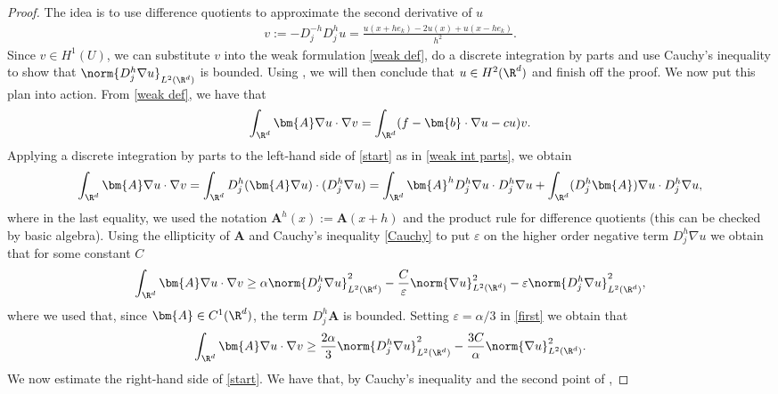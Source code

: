 \documentclass[
    a4paper,
    DIV=14,
    abstract=true,
    numbers=noenddot
]{scrartcl}
\begin{document}
\begin{proof}
    The idea is to use difference quotients to approximate the second derivative of $u$
    \begin{align*}
        v:= -D_j^{-h} D_j^h u = \frac{u(x+he_k)-2u(x)+u(x-he_k)}{h^2}.
    \end{align*}
    Since $v \in H^1(U)$, we can substitute $v$ into the weak formulation \eqref{weak def}, do a discrete integration by parts and use Cauchy's inequality to show that $\norm{D_j^h \nabla u}_{L^2(\R^d)}$ is bounded. Using , we will then conclude that $u \in H^{2}(\R^d)$ and finish off the proof. We now put this plan into action. From \eqref{weak def}, we have that
    \begin{align}\label{start}
        \int_{\R^d} \bm{A} \nabla u \cdot \nabla v =\int_{\R^d} (f- \bm{b} \cdot \nabla u -cu)v.
    \end{align}
    Applying a discrete integration by parts to the left-hand side of \eqref{start} as in \eqref{weak int parts}, we obtain
    \begin{align*}
        \int_{\R^d} \bm{A} \nabla u \cdot \nabla v = \int_{\R^d} D_j^h( \bm{A} \nabla u) \cdot (D_j^h \nabla u)= \int_{\R^d} \bm{A}^h D_j^h \nabla u \cdot D_j^h \nabla u+ \int_{\R^d} (D_j^h\bm{A}) \nabla u \cdot D_j^h \nabla u,
    \end{align*}
    where in the last equality, we used the notation $\bm{A}^h(x):=\bm{A}(x+h)$ and the product rule for difference quotients (this can be checked by basic algebra). Using the ellipticity of $\bm{A}$ and Cauchy's inequality \eqref{Cauchy} to put $\varepsilon $ on the higher order negative term $D_j^h \nabla  u$ we obtain that for some constant $C$
    \begin{align}\label{first}
        \int_{\R^d} \bm{A} \nabla u \cdot \nabla v \geq \alpha \norm{D_j^h \nabla u}_{L^2(\R^d)}^2 -\frac{C}{\varepsilon }\norm{ \nabla u}_{L^2(\R^d)}^2-\varepsilon \norm{D_j^h \nabla u}_{L^2(\R^d)}^2,
    \end{align}
    where we used that, since $\bm{A} \in C^1(\R^d)$, the term $D_j^h \bm{A}$ is bounded. Setting $\varepsilon =\alpha /3$ in \eqref{first} we obtain that
    \begin{align}\label{second}
        \int_{\R^d} \bm{A} \nabla u \cdot \nabla v \geq \frac{2\alpha}{3} \norm{D_j^h \nabla u}_{L^2(\R^d)}^2-\frac{3C}{\alpha}\norm{\nabla u}_{L^2(\R^d)}^2.
    \end{align}
    We now estimate the right-hand side of \eqref{start}. We have that, by Cauchy's inequality and the second point of ,

\end{proof}
\end{document}
